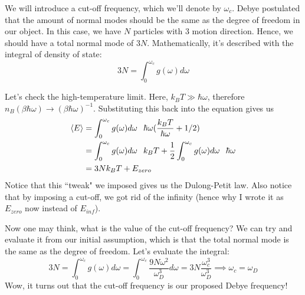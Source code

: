 \documentclass[12pt]{article}
\begin{document}
\vspace{0.25 in}

We will introduce a cut-off frequency, which we'll denote by $\omega_c$. Debye postulated that the amount of normal modes should be the same as the degree of freedom in our object. In this case, we have $N$ particles with 3 motion direction. Hence, we should have a total normal mode of $3N$. Mathematically, it's described with the integral of density of state:
\begin{equation*}
    3N=\int_0^{\omega_c}g(\omega)d\omega
\end{equation*}

Let's check the high-temperature limit. Here, $k_BT\gg\hbar\omega$, therefore $n_B(\beta\hbar\omega)\rightarrow(\beta\hbar\omega)^{-1}$. Substituting this back into the equation gives us
\begin{align*}
    \langle E\rangle&=\int_0^{\omega_c}g(\omega)d\omega\hspace{0.1in}\hbar\omega(\frac{k_BT}{\hbar\omega}+1/2)\\
    &=\int_0^{\omega_c}g(\omega)d\omega\hspace{0.1in}k_BT + \frac{1}{2}\int_0^{\omega_c}g(\omega)d\omega\hspace{0.1in}\hbar\omega\\
    &=3Nk_BT+E_{zero}
\end{align*}
Notice that this ``tweak" we imposed gives us the Dulong-Petit law. Also notice that by imposing a cut-off, we got rid of the infinity (hence why I wrote it as $E_{zero}$ now instead of $E_{inf}$).

\vspace{0.25 in}

Now one may think, what is the value of the cut-off frequency? We can try and evaluate it from our initial assumption, which is that the total normal mode is the same as the degree of freedom. Let's evaluate the integral:
\begin{equation*}
    3N=\int_0^{\omega_{c}}g(\omega)d\omega=\int_0^{\omega_c}\frac{9N\omega^2}{\omega_D^3}d\omega=3N\frac{\omega_c^3}{\omega_D^3}\implies\omega_c=\omega_D
\end{equation*}
Wow, it turns out that the cut-off frequency is our proposed Debye frequency!

\newpage
\end{document}
